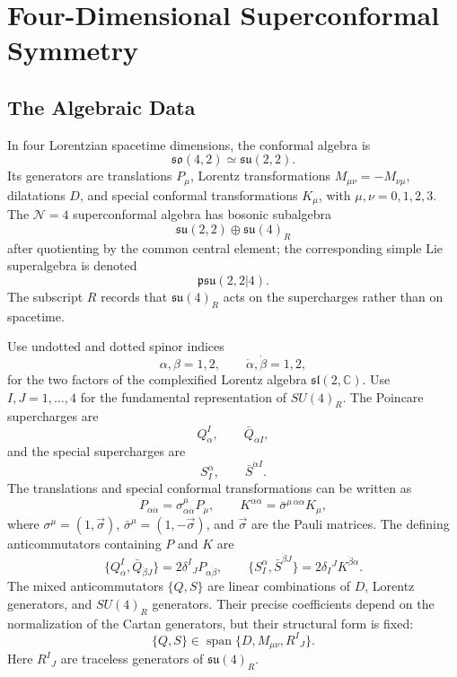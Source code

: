 \chapter{Four-Dimensional Superconformal Symmetry}
\label{ch:volume-iii-four-dimensional-superconformal-symmetry}

\section{The Algebraic Data}

In four Lorentzian spacetime dimensions, the conformal algebra is
\[
  \mathfrak{so}(4,2)\simeq \mathfrak{su}(2,2).
\]
Its generators are translations \(P_\mu\), Lorentz transformations
\(M_{\mu\nu}=-M_{\nu\mu}\), dilatations \(D\), and special conformal
transformations \(K_\mu\), with \(\mu,\nu=0,1,2,3\).  The
\(\mathcal N=4\) superconformal algebra has bosonic subalgebra
\[
  \mathfrak{su}(2,2)\oplus \mathfrak{su}(4)_R
\]
after quotienting by the common central element; the corresponding simple
Lie superalgebra is denoted
\[
  \mathfrak{psu}(2,2|4).
\]
The subscript \(R\) records that \(\mathfrak{su}(4)_R\) acts on the
supercharges rather than on spacetime.

Use undotted and dotted spinor indices
\[
  \alpha,\beta=1,2,
  \qquad
  \dot\alpha,\dot\beta=1,2,
\]
for the two factors of the complexified Lorentz algebra
\(\mathfrak{sl}(2,\mathbb C)\).  Use \(I,J=1,\ldots,4\) for the
fundamental representation of \(SU(4)_R\).  The Poincare supercharges are
\[
  Q^I_\alpha,
  \qquad
  \bar Q_{\dot\alpha I},
\]
and the special supercharges are
\[
  S^\alpha_I,
  \qquad
  \bar S^{\dot\alpha I}.
\]
The translations and special conformal transformations can be written as
\[
  P_{\alpha\dot\alpha}
  =
  \sigma^\mu_{\alpha\dot\alpha}P_\mu,
  \qquad
  K^{\dot\alpha\alpha}
  =
  \bar\sigma^{\mu\,\dot\alpha\alpha}K_\mu ,
\]
where \(\sigma^\mu=(1,\vec\sigma)\), \(\bar\sigma^\mu=(1,-\vec\sigma)\),
and \(\vec\sigma\) are the Pauli matrices.  The defining anticommutators
containing \(P\) and \(K\) are
\begin{equation}
  \{Q^I_\alpha,\bar Q_{\dot\beta J}\}
  =
  2\delta^I{}_J P_{\alpha\dot\beta},
  \qquad
  \{S^\alpha_I,\bar S^{\dot\beta J}\}
  =
  2\delta_I{}^J K^{\dot\beta\alpha}.
  \label{eq:n4-qq-ss-anticommutators}
\end{equation}
The mixed anticommutators \(\{Q,S\}\) are linear combinations of \(D\),
Lorentz generators, and \(SU(4)_R\) generators.  Their precise coefficients
depend on the normalization of the Cartan generators, but their structural
form is fixed:
\[
  \{Q,S\}\in
  \operatorname{span}\{D,M_{\mu\nu},R^I{}_J\}.
\]
Here \(R^I{}_J\) are traceless generators of \(\mathfrak{su}(4)_R\).


